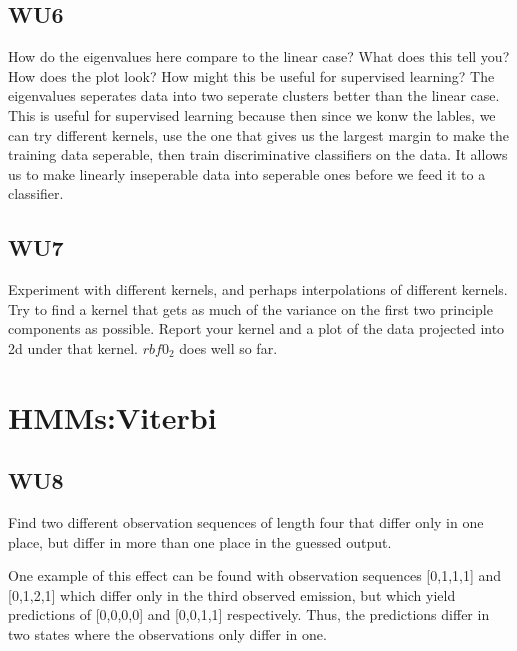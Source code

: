 \documentclass[a4paper,11pt]{article}
\begin{document}
\subsection{WU6}
\textsf{How do the eigenvalues here compare to the linear case? What
does this tell you? How does the plot look? How might this be useful
for supervised learning?}\vspace{0.1in}
The eigenvalues seperates data into two
seperate clusters better than the linear case. This is useful for
supervised learning because then since we konw the lables, we can try
different kernels, use the one that gives us the largest margin to
make the training data seperable, then train discriminative
classifiers on the data. It allows us to make linearly inseperable
data into seperable ones before we feed it to a classifier.

\subsection{WU7}
\textsf{Experiment with different kernels, and perhaps interpolations 
of different kernels. Try to find a kernel that gets as much of the 
variance on the first two principle components as possible. Report your 
kernel and a plot of the data projected into 2d under that kernel.}\vspace{0.1in}
$rbf0_2$ does well so far.
\pagebreak
\section{HMMs:Viterbi}
\subsection{WU8}
\textsf{Find two different observation sequences of length four that
differ only in one place, but differ in more than one place in the
guessed output.}\vspace{0.1in}


One example of this effect can be found with observation sequences
[0,1,1,1] and [0,1,2,1] which differ only in the third observed emission,
but which yield predictions of [0,0,0,0] and [0,0,1,1] respectively.
Thus, the predictions differ in two states where the observations only
differ in one.
\end{document}
